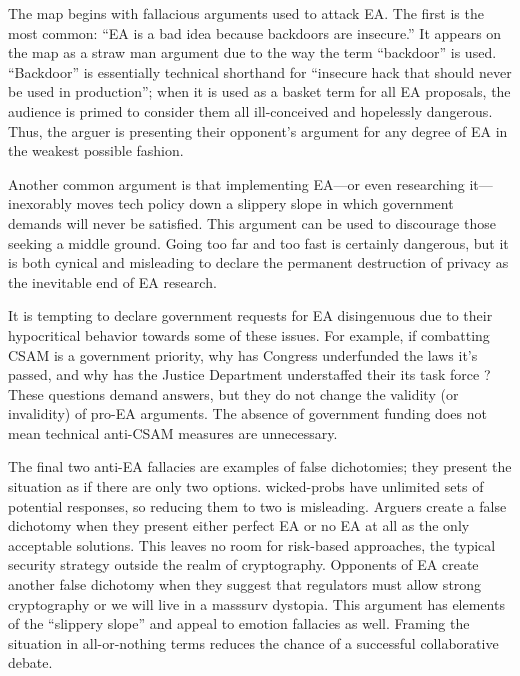 The map begins with fallacious arguments used to attack \ac{EA}. The first is the most common: ``\ac{EA} is a bad idea
because backdoors are insecure.'' It appears on the map as a straw man argument due to the way the term ``backdoor'' is
used. ``Backdoor'' is essentially technical shorthand for ``insecure hack that should never be used in production'';
when it is used as a basket term for all \ac{EA} proposals, the audience is primed to consider them all ill-conceived
and hopelessly dangerous. Thus, the arguer is presenting their opponent's argument for any degree of \ac{EA} in the
weakest possible fashion.

Another common argument is that implementing \ac{EA}---or even researching it---inexorably moves tech policy down a
slippery slope in which government demands will never be satisfied. This argument can be used to discourage those
seeking a middle ground. Going too far and too fast is certainly dangerous, but it is both cynical and misleading to
declare the permanent destruction of privacy as the inevitable end of \ac{EA} research.

It is tempting to declare government requests for \ac{EA} disingenuous due to their hypocritical behavior towards some
of these issues. For example, if combatting \ac{CSAM} is a government priority, why has Congress underfunded the laws
it's passed, and why has the Justice Department understaffed their its task force \cite{keller_internet_2019}? These
questions demand answers, but they do not change the validity (or invalidity) of pro-\ac{EA} arguments. The absence of
government funding does not mean technical anti-\ac{CSAM} measures are unnecessary.

The final two anti-\ac{EA} fallacies are examples of false dichotomies; they present the situation as if there are only
two options. \Acp{wicked-prob} have unlimited sets of potential responses, so reducing them to two is misleading.
Arguers create a false dichotomy when they present either perfect \ac{EA} or no \ac{EA} at all as the only acceptable
solutions. This leaves no room for risk-based approaches, the typical security strategy outside the realm of
cryptography. Opponents of \ac{EA} create another false dichotomy when they suggest that regulators must allow strong
cryptography or we will live in a \ac{masssurv} dystopia. This argument has elements of the ``slippery slope'' and
appeal to emotion fallacies as well. Framing the situation in all-or-nothing terms reduces the chance of a successful
collaborative debate.

